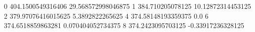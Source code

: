 0 404.1500549316406 29.568572998046875
1 384.710205078125 10.12872314453125
2 379.97076416015625 5.3892822265625
4 374.58148193359375 0.0
6 374.6518859863281 0.070404052734375
8 374.2423095703125 -0.33917236328125
